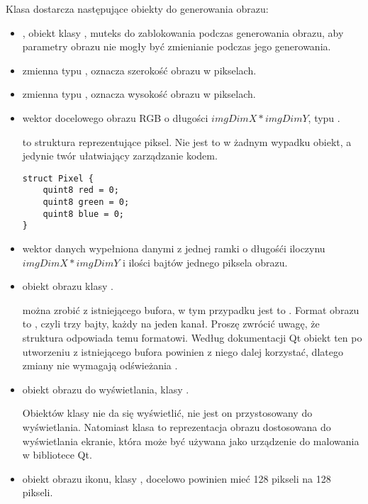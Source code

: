 \label{sec:algorithm-pixmap-generate}

Klasa  dostarcza następujące obiekty do generowania obrazu:
\begin{itemize}
    \item {}, obiekt klasy , muteks do zablokowania podczas generowania obrazu, aby parametry obrazu nie mogły być zmienianie podczas jego generowania.

    \item {} zmienna typu , oznacza szerokość obrazu w pikselach.

    \item {} zmienna typu , oznacza wysokość obrazu w pikselach.

    \item {} wektor docelowego obrazu RGB o długości $imgDimX*imgDimY$, typu .

           to struktura reprezentujące piksel.
          Nie jest to w żadnym wypadku obiekt, a jedynie twór ułatwiający zarządzanie kodem.

          \begin{lstlisting}
struct Pixel {
    quint8 red = 0;   
    quint8 green = 0;    
    quint8 blue = 0;   
}\end{lstlisting}

    \item {} wektor danych wypełniona danymi z jednej ramki o długośći iloczynu $imgDimX*imgDimY$ i ilości bajtów jednego piksela obrazu.

    \item {} obiekt obrazu klasy .

           można zrobić z istniejącego bufora, w tym przypadku jest to .
          Format obrazu to , czyli trzy bajty, każdy na jeden kanał.
          Proszę zwrócić uwagę, że struktura  odpowiada temu formatowi.
          Według dokumentacji Qt obiekt ten po utworzeniu z istniejącego bufora powinien z niego dalej korzystać, dlatego zmiany  nie wymagają odświeżania .

    \item {} obiekt obrazu do wyświetlania, klasy .

          Obiektów klasy  nie da się wyświetlić, nie jest on przystosowany do wyświetlania.
          Natomiast klasa  to reprezentacja obrazu dostosowana do wyświetlania ekranie, która może być używana jako urządzenie do malowania w bibliotece Qt.

    \item {} obiekt obrazu ikonu, klasy , docelowo powinien mieć 128 pikseli na 128 pikseli.

\end{itemize}

